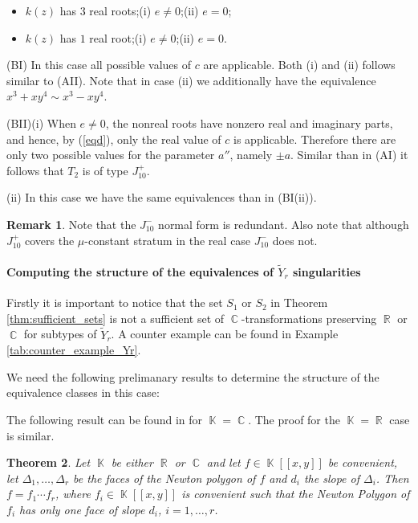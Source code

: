 \documentclass[noend]{amsproc}
\newtheorem{theorem}{Theorem}
\theoremstyle{definition}
\newtheorem{remark}[theorem]{Remark}
\DeclareMathOperator{\R}{\mathbb{R}}
\DeclareMathOperator{\C}{\mathbb{C}}
\DeclareMathOperator{\K}{\mathbb{K}}
\begin{document}
\begin{itemize}
\item[(BI)]$k(z)$ has $3$ real roots;\quad (i) $e\neq 0$;\quad (ii) $e=0$;
\item[(BII)]$k(z)$ has $1$ real root;\quad (i) $e\neq 0$;\quad (ii) $e=0$.
\end{itemize}
(BI) In this case all possible values of $c$ are applicable. Both (i) and (ii)
follows similar to (AII). Note that in case (ii) we additionally have the
equivalence $x^3+xy^4\sim x^3-xy^4$.

(BII)(i) When $e\neq 0$, the nonreal roots have nonzero real and imaginary
parts, and hence, by (\ref{eqd}), only the real value of $c$ is applicable.
Therefore there are only two possible values for the parameter $a''$, namely
$\pm a$. Similar than in (AI) it follows that $T_2$ is of type $J_{10}^+$.

(ii) In this case
we have the same equivalences than in (BI(ii)).

\begin{remark}
Note that the $J_{10}^-$ normal form is redundant. Also note that although
$J_{10}^+$ covers the $\mu$-constant stratum in the real case $J_{10}^-$ does
not.
\end{remark}
\paragraph{\bf Computing the structure of the equivalences of $\widetilde Y_r$
singularities}
Firstly it is important to notice that the set $S_1$ or $S_2$ in Theorem
\ref{thm:sufficient_sets} is not a sufficient set of $\C$-transformations
preserving $\R$ or $\C$ for subtypes of $\widetilde Y_r$. A counter example can
be found in Example \ref{tab:counter_example_Yr}.

We need the following prelimanary results to determine the structure of the
equivalence classes in this case:

The following result can be found in \citet{PdJ2000} for $\K=\C$. The proof for
the $\K=\R$ case is similar.

\begin{theorem}\label{faces}
Let $\K$ be either $\R$ or $\C$ and let $f\in\K[[x,y]]$ be convenient, let
$\Delta_1,\ldots,\Delta_r$ be the faces of the Newton polygon of $f$ and $d_i$
the slope of $\Delta_i$. Then $f=f_1\cdots f_r$, where $f_i\in\K[[x,y]]$ is
convenient such that the Newton Polygon of $f_i$ has only one face of slope
$d_i$, $i=1,\ldots,r$.
\end{theorem}
\end{document}
